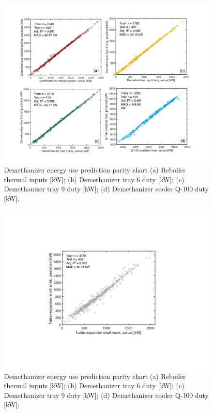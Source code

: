 \documentclass[11pt]{report}
\begin{document}
\begin{figure}
\includegraphics[width=0.85
\columnwidth]{images/demethanizer_duty.pdf}
\caption{Demethanizer energy use prediction parity chart (a) Reboiler thermal inputs [kW]; (b) Demethanizer tray 6 duty [kW]; (c) Demethanizer tray 9 duty [kW]; (d) Demethanizer cooler Q-100 duty [kW].}
\label{fig:demethanizer_duty}
\end{figure}
\begin{figure}
\includegraphics[width=0.85\columnwidth]{images/demethanizer_turboepander.pdf}
\caption{Demethanizer energy use prediction parity chart (a) Reboiler thermal inputs [kW]; (b) Demethanizer tray 6 duty [kW]; (c) Demethanizer tray 9 duty [kW]; (d) Demethanizer cooler Q-100 duty [kW].}
\label{fig:demethanizer_turboexpander}
\end{figure}
\end{document}
